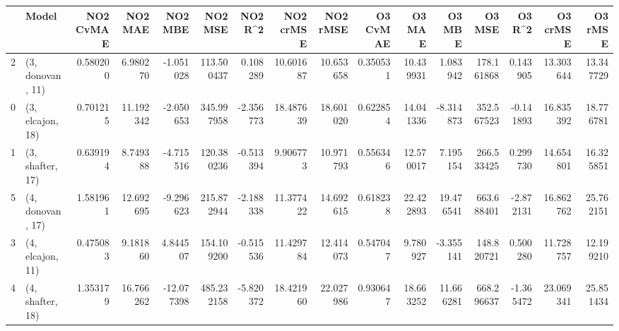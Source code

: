 \begin{tabular}{llrrrrrrrrrrrrrr}
\toprule
{} &             Model &  NO2 CvMAE &    NO2 MAE &    NO2 MBE &     NO2 MSE &   NO2 R\textasciicircum2 &  NO2 crMSE &   NO2 rMSE &  O3 CvMAE &     O3 MAE &     O3 MBE &      O3 MSE &    O3 R\textasciicircum2 &   O3 crMSE &    O3 rMSE \\
\midrule
2 &  (3, donovan, 11) &   0.580200 &   6.980270 &  -1.051028 &  113.500437 &  0.108289 &  10.601687 &  10.653658 &  0.350531 &  10.439931 &   1.083942 &  178.161868 &  0.143905 &  13.303644 &  13.347729 \\
0 &  (3, elcajon, 18) &   0.701215 &  11.192342 &  -2.050653 &  345.997958 & -2.356773 &  18.487639 &  18.601020 &  0.622854 &  14.041336 &  -8.314873 &  352.567523 & -0.141893 &  16.835392 &  18.776781 \\
1 &  (3, shafter, 17) &   0.639194 &   8.749388 &  -4.715516 &  120.380236 & -0.513394 &   9.906773 &  10.971793 &  0.556346 &  12.570017 &   7.195154 &  266.533425 &  0.299730 &  14.654801 &  16.325851 \\
5 &  (4, donovan, 17) &   1.581961 &  12.692695 &  -9.296623 &  215.872944 & -2.188338 &  11.377422 &  14.692615 &  0.618238 &  22.422893 &  19.476541 &  663.688401 & -2.872131 &  16.862762 &  25.762151 \\
3 &  (4, elcajon, 11) &   0.475083 &   9.181860 &   4.844507 &  154.109200 & -0.515536 &  11.429784 &  12.414073 &  0.547047 &   9.780927 &  -3.355141 &  148.820721 &  0.500280 &  11.728757 &  12.199210 \\
4 &  (4, shafter, 18) &   1.353179 &  16.766262 & -12.077398 &  485.232158 & -5.820372 &  18.421960 &  22.027986 &  0.930647 &  18.663252 &  11.666281 &  668.296637 & -1.365472 &  23.069341 &  25.851434 \\
\bottomrule
\end{tabular}
